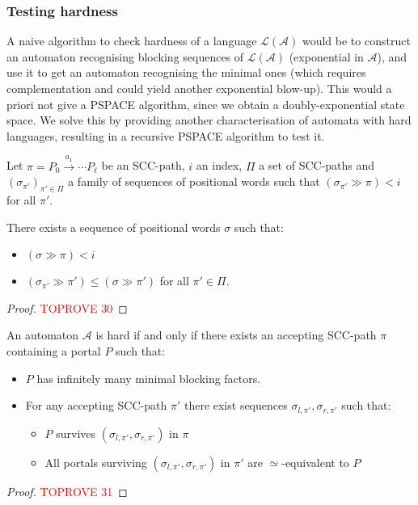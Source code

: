 \documentclass[letterpaper, USenglish, cleveref, autoref, thm-restate, numberwithinsect]{lipics-v2021}
\theoremstyle{theorem}
\theoremstyle{definition}
\newcommand{\Aa}{\mathcal{A}}
\newcommand{\equivportals}{\simeq}
\newcommand{\lang}[1]{\mathcal{L}(#1)}
\newcommand{\lefteffect}[2]{(#1 \gg #2)}
\newcommand{\PSPACE}{\textsf{PSPACE}\xspace}
\newcommand{\SCCpath}{\pi}
\begin{document}
\subsubsection{Testing hardness}

A naive algorithm to check hardness of a language $\lang{\Aa}$ would be to construct an automaton recognising blocking sequences of $\lang{\Aa}$ (exponential in $\Aa$), and use it to get an automaton recognising the minimal ones (which requires complementation and could yield another exponential blow-up). This would a priori not give a \PSPACE algorithm, since we obtain a doubly-exponential state space.
We solve this by providing another characterisation of automata with hard languages, resulting in a recursive \PSPACE algorithm to test it.


\begin{lemma}
	\label{lem:uniformisation-blocking-seq}
	Let $\SCCpath = P_0 \xrightarrow{a_1} \cdots  P_\ell$ be an SCC-path, $i$ an index, $\Pi$ a set of SCC-paths and $(\sigma_{\SCCpath'})_{\SCCpath' \in \Pi}$ a family of sequences of positional words such that $\lefteffect{\sigma_{\SCCpath'}}{\SCCpath} < i$ for all $\SCCpath'$.
	
	There exists a sequence of positional words $\sigma$ such that:
	\begin{itemize}
		\item $\lefteffect{\sigma}{\pi} < i$
		\item $\lefteffect{\sigma_{\SCCpath'}}{\SCCpath'} \leq \lefteffect{\sigma}{\SCCpath'}$ for all $\SCCpath' \in \Pi$.
	\end{itemize}
\end{lemma}

\begin{proof}\textcolor{red}{TOPROVE 30}\end{proof}

\begin{lemma}\label{lem:charac-hard-PSPACE}
	An automaton $\Aa$ is hard if and only if there exists an accepting SCC-path $\SCCpath$ containing a portal $P$ such that:
	\begin{itemize}
		\item $P$ has infinitely many minimal blocking factors.
		\item For any accepting SCC-path $\SCCpath'$ there exist sequences $\sigma_{l, \SCCpath'}, \sigma_{r, \SCCpath'}$ such that: 
		\begin{itemize}
			\item $P$ survives $(\sigma_{l, \SCCpath'}, \sigma_{r, \SCCpath'})$ in $\SCCpath$
			\item All portals surviving $(\sigma_{l, \SCCpath'}, \sigma_{r, \SCCpath'})$ in $\SCCpath'$ are $\equivportals$-equivalent to $P$
		\end{itemize} 
	\end{itemize} 
\end{lemma}
\begin{proof}\textcolor{red}{TOPROVE 31}\end{proof}
\end{document}
